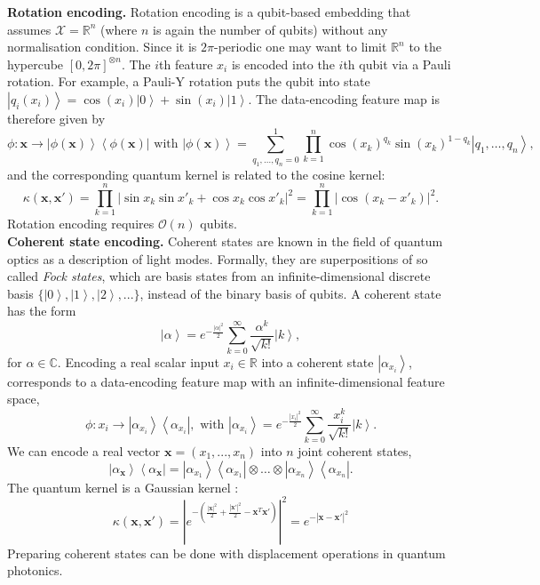 \documentclass[aps, reprint, onecolumn, nofootinbib, longbibliography]{revtex4-2}
\newcommand{\ket}[1]{\ensuremath{\left| #1 \right \rangle}}
\newcommand{\bra}[1]{\ensuremath{\left \langle #1 \right |}}
\newcommand{\ketbra}[2]{\ket{#1}\!\bra{#2}}
\begin{document}
\textbf{Rotation encoding.} Rotation encoding is a qubit-based embedding that assumes $\mathcal{X} = \mathbb{R}^{n}$ (where $n$ is again the number of qubits) without any normalisation condition. Since it is $2\pi$-periodic one may want to limit $\mathbb{R}^{n}$ to the hypercube  $[0, 2\pi]^{\otimes n}$. The $i$th feature $x_i$ is encoded into the $i$th qubit via a Pauli rotation. For example, a Pauli-Y rotation puts the qubit into state $\ket{q_i(x_i)} = \cos(x_i) \ket{0} + \sin(x_i) \ket{1}$. The data-encoding feature map is therefore given by
\begin{equation}\phi: \mathbf{x} \rightarrow \ketbra{\phi(\mathbf{x})}{\phi(\mathbf{x})} \text{ with } \ket{\phi( \mathbf{x})} = \sum_{q_1,\dots, q_n = 0}^{1} \prod_{k=1}^n \cos (x_k)^{q_k}  \sin (x_k)^{1-q_k} \ket{q_1, \dots, q_n}, \end{equation}
and the corresponding quantum kernel is related to the cosine kernel:
\begin{equation} \kappa(\mathbf{x},\mathbf{x}') = \prod_{k=1}^n  |\sin x_k \sin x'_k + \cos x_k \cos x'_k|^2 = \prod_{k=1}^n |\cos (x_k - x'_k)|^2. \end{equation}
Rotation encoding requires $\mathcal{O}(n)$ qubits.\\

\textbf{Coherent state encoding.} Coherent states are known in the field of quantum optics as a description of light modes. Formally, they are superpositions of so called \textit{Fock states}, which are basis states from an infinite-dimensional discrete basis $\{\ket{0}, \ket{1}, \ket{2},...\}$, instead of the binary basis of qubits. 
A coherent state has the form
\begin{equation} \ket{\alpha} = e^{- \frac{|\alpha|^2}{2}} \sum\limits_{k=0}^{\infty} \frac{\alpha^k}{\sqrt{k!}} \ket{k},\end{equation}
for $\alpha \in \mathbb{C}$.
Encoding a real scalar input $x_i \in \mathbb{R}$ into a coherent state $\ket{\alpha_{x_i}}$, corresponds to a data-encoding feature map with an infinite-dimensional feature space, 
\begin{equation}\phi: x_i   \rightarrow \ketbra{\alpha_{x_i}}{\alpha_{x_i}}, \text{ with } \ket{\alpha_{x_i}} = e^{- \frac{|x_i|^2}{2}} \sum\limits_{k=0}^{\infty} \frac{x_i^k}{\sqrt{k!}} \ket{k} .  \end{equation}
We can encode a real vector $\mathbf{x} =(x_1,...,x_n)$ into $n$ joint coherent states,
\begin{equation}  \ketbra{\alpha_{\mathbf{x}}}{\alpha_{\mathbf{x}}} = \ketbra{\alpha_{x_1}}{\alpha_{x_1}} \otimes  \dots \otimes  \ketbra{\alpha_{x_n}}{\alpha_{x_n}}. \end{equation}
The quantum kernel is a Gaussian kernel \cite{chatterjee2016generalized}:
\begin{equation}\kappa(\mathbf{x}, \mathbf{x}') =  \left|e^{- \left( \frac{ |\mathbf{x}|^2}{2} +\frac{|\mathbf{x}'|^2}{2} - \mathbf{x}^{T}\mathbf{x}'   \right)}\right|^2 = e^{- |\mathbf{x} - \mathbf{x}'|^2 } \end{equation}
Preparing coherent states can be done with displacement operations in quantum photonics.
\end{document}
